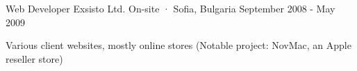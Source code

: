 \begin{cventries}
  \cventry
    {Web Developer} %
    {Exsisto Ltd.} %
    {On-site · Sofia, Bulgaria} %
    {September 2008 - May 2009} %
    {
      \begin{cvitems} %
        \item {Various client websites, mostly online stores (Notable project: NovMac, an Apple reseller store)}
      \end{cvitems}
    }

\end{cventries}
